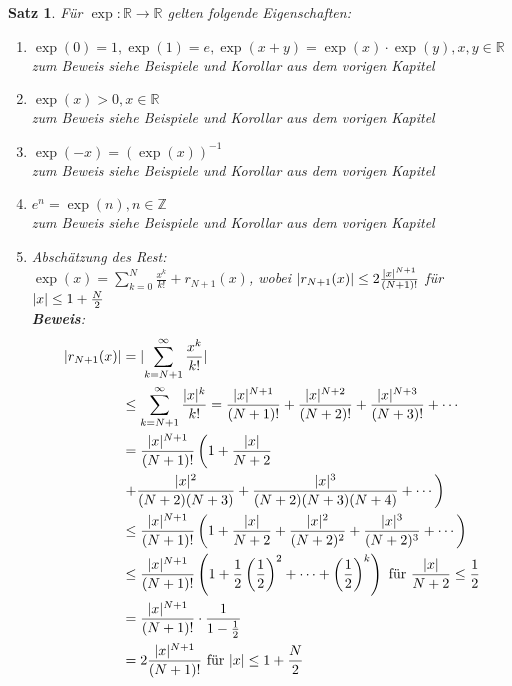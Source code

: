 \documentclass[ngerman,titlepage,twoside, parskip=half*]{scrreprt}
\newcommand*{\Z}{\mathbb{Z}}
\newcommand*{\R}{\mathbb{R}}
\theoremstyle{break}
\newtheorem{theorem}{Satz}[section]
\theoremstyle{nonumberbreak}
\DeclarePairedDelimiter{\abs}{\lvert}{\rvert}
\begin{document}
\begin{theorem}
  \label{satz:expEigenschaft}
Für $\exp\colon\R\rightarrow\R$ gelten folgende Eigenschaften:
\begin{enumerate}[i]
  \item $\exp(0)=1, \exp(1)=e, \exp(x+y)=\exp(x)\cdot \exp(y), x,y \in \R$\\
    zum Beweis siehe Beispiele und Korollar aus dem vorigen Kapitel
  \item $\exp(x)>0, x\in \R$\\
    zum Beweis siehe Beispiele und Korollar aus dem vorigen Kapitel
  \item $\exp(-x)=(\exp(x))^{-1}$\\
    zum Beweis siehe Beispiele und Korollar aus dem vorigen Kapitel
  \item $e^n=\exp(n), n\in \Z$\\
    zum Beweis siehe Beispiele und Korollar aus dem vorigen Kapitel
  \item Abschätzung des Rest:\\
    $\exp(x)=\sum_{k=0}^N \frac{x^k}{k!}+r_{N+1}(x)$, wobei $\abs{r_{N+1}(x)}\leq 2\frac{\abs{x}^{N+1}}{(N+1)!}$ für $\abs{x}\leq 1+\frac{N}{2}$\\
    \textbf{Beweis}:
    \begin{align*}
      \abs{r_{N+1}(x)} &= \abs{\sum_{k=N+1}^\infty \frac{x^k}{k!}}\\
      &\leq \sum_{k=N+1}^\infty \frac{\abs{x}^k}{k!}=\frac{\abs{x}^{N+1}}{(N+1)!}+\frac{\abs{x}^{N+2}}{(N+2)!}+\frac{\abs{x}^{N+3}}{(N+3)!}+\cdots\\
      &= \frac{\abs{x}^{N+1}}{(N+1)!}\left( 1+\frac{\abs{x}}{N+2}\right.\\
      & \left. +\frac{\abs{x}^2}{(N+2)(N+3)}+\frac{\abs{x}^3}{(N+2)(N+3)(N+4)}+\cdots\right)\\
      &\leq \frac{\abs{x}^{N+1}}{(N+1)!}\left( 1+\frac{\abs{x}}{N+2}+\frac{\abs{x}^2}{(N+2)^2}+\frac{\abs{x}^3}{(N+2)^3}+\cdots \right)\\
      &\leq \frac{\abs{x}^{N+1}}{(N+1)!}\left( 1+\frac{1}{2}\left(\frac{1}{2}\right)^2+\cdots + \left(\frac{1}{2}\right)^k\right)
        \text{ für } \frac{\abs{x}}{N+2}\leq \frac{1}{2}\\
      &= \frac{\abs{x}^{N+1}}{(N+1)!}\cdot \frac{1}{1-\frac{1}{2}}\\
      &= 2\frac{\abs{x}^{N+1}}{(N+1)!} \text{ für } \abs{x}\leq 1+\frac{N}{2}
    \end{align*}
\end{enumerate}
\end{theorem}
\end{document}
